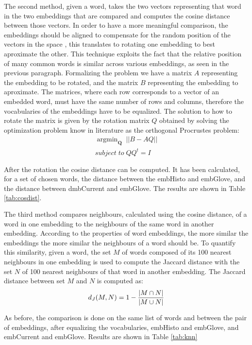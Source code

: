 \documentclass[runningheads]{llncs}
\begin{document}
The second method, given a word, takes the two vectors representing that word in the two embeddings that are compared and computes the cosine distance between those vectors. In order to have a more meaningful comparison, the embeddings should be aligned to compensate for the random position of the vectors in the space \cite{embcomp}, this translates to rotating one embedding to best aproximate the other. This technique exploits the fact that the relative position of many common words is similar across various embeddings, as seen in the previous paragraph. Formalizing the problem we have a matrix $A$ representing the embedding to be rotated, and the matrix $B$ representing the embedding to aproximate. The matrices, where each row corresponds to a vector of an embedded word, must have the same number of rows and columns, therefore the vocabularies of the embeddings have to be equalized. The solution to how to rotate the matrix is given by the rotation matrix $Q$ obtained by solving the optimization problem know in literature as the orthogonal Procrustes problem:
\begin{align*}
\mathop{argmin}_{\textbf{Q}}\; ||B - AQ|| \\
subject\; to\; QQ^t = I
\end{align*}

After the rotation the cosine distance can be computed. It has been calculated, for a set of chosen words, the distance between the embHisto and embGlove, and the distance between dmbCurrent and embGlove. The results are shown in Table \ref{tab:cosdist}.

The third method compares neighbours, calculated using the cosine distance, of a word in one embedding to the neighbours of the same word in another embedding. According to the properties of word embeddings, the more similar the embeddings the more similar the neighbours of a word should be. To quantify this similarity, given a word, the set $M$ of words composed of its 100 nearest neighbours in one embedding is used to compute the Jaccard distance with the set $N$ of 100 nearest neighbours of that word in another embedding. The Jaccard distance between set $M$ and $N$ is computed as:
\begin{align*}
d_J(M,N) = 1 - { |M \cap N| \over |M \cup N| }
\end{align*}

As before, the comparison is done on the same list of words and between the pair of embeddings, after equalizing the vocabularies, embHisto and embGlove, and embCurrent and embGlove. Results are shown in Table \ref{tab:knn}
\end{document}
